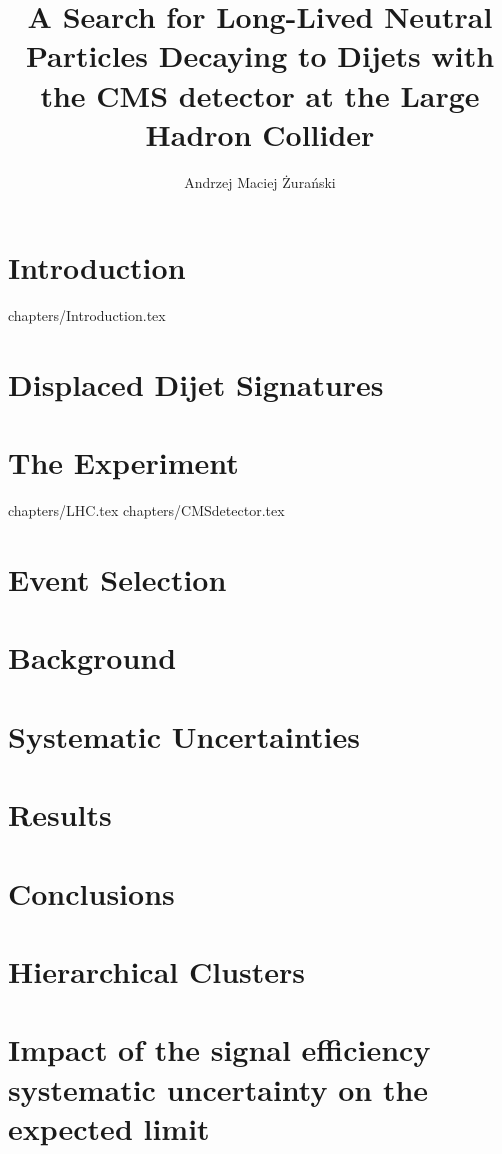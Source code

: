 \documentclass[phd,black]{PrincetonThesis}
\title{A Search for Long-Lived Neutral Particles Decaying to Dijets with the CMS detector at the
Large Hadron Collider}
\author{Andrzej Maciej \.Zura\'nski}
\begin{document}
\begin{frontmatter}
  \begin{thesisabstract}
    
  \end{thesisabstract}
  \begin{acknowledgements}
    
  \end{acknowledgements}
\end{frontmatter}


\chapter{Introduction}
\label{chap:intro}
 {chapters/Introduction.tex}
\chapter{Displaced Dijet Signatures}

\chapter{The Experiment}
\label{chap:cmslhc}
 {chapters/LHC.tex}
 {chapters/CMSdetector.tex}

\chapter{Event Selection}
\label{chap:selection}
 
 

\chapter{Background}


\chapter{Systematic Uncertainties}


\chapter{Results}


\chapter{Conclusions}
%


\appendix
\chapter{Hierarchical Clusters}

\chapter{Impact of the signal efficiency systematic uncertainty on the expected limit}

\cleardoublepage 
\end{document}

